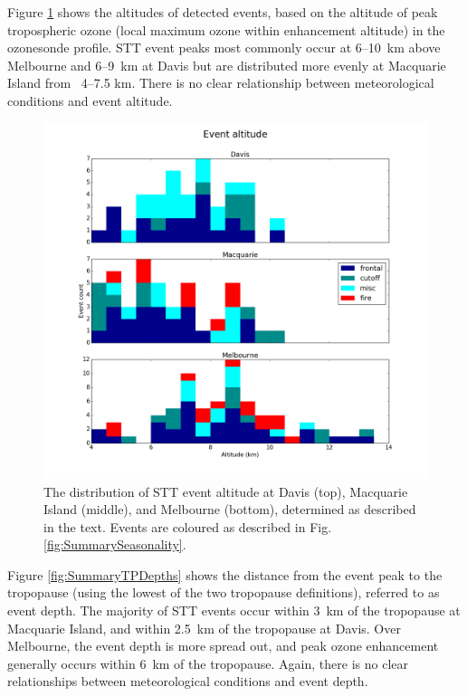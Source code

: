 \documentclass[acp, manuscript]{copernicus} %
\begin{document}
  Figure \ref{fig:SummaryAltitudes} shows the altitudes of detected events, based on the altitude of peak tropospheric ozone (local maximum ozone within enhancement altitude) in the ozonesonde profile.
  STT event peaks most commonly occur at 6--10~km above Melbourne and 6--9~km at Davis but are distributed more evenly at Macquarie Island from ~4--7.5 km.
  There is no clear relationship between meteorological conditions and event altitude.

  \begin{figure}[t]
    \includegraphics[width=12cm]{figures/summary_altitude.png}
    \caption{The distribution of STT event altitude at Davis (top), Macquarie Island (middle), and Melbourne (bottom), determined as described in the text.
    Events are coloured as described in Fig. \ref{fig:SummarySeasonality}.}
    \label{fig:SummaryAltitudes}
  \end{figure}

  Figure \ref{fig:SummaryTPDepths} shows the distance from the event peak to the tropopause (using the lowest of the two tropopause definitions), referred to as event depth.
  The majority of STT events occur within 3~km of the tropopause at Macquarie Island, and within 2.5~km of the tropopause at Davis. 
  Over Melbourne, the event depth is more spread out, and peak ozone enhancement generally occurs within 6~km of the tropopause.
  Again, there is no clear relationships between meteorological conditions and event depth.
\end{document}
